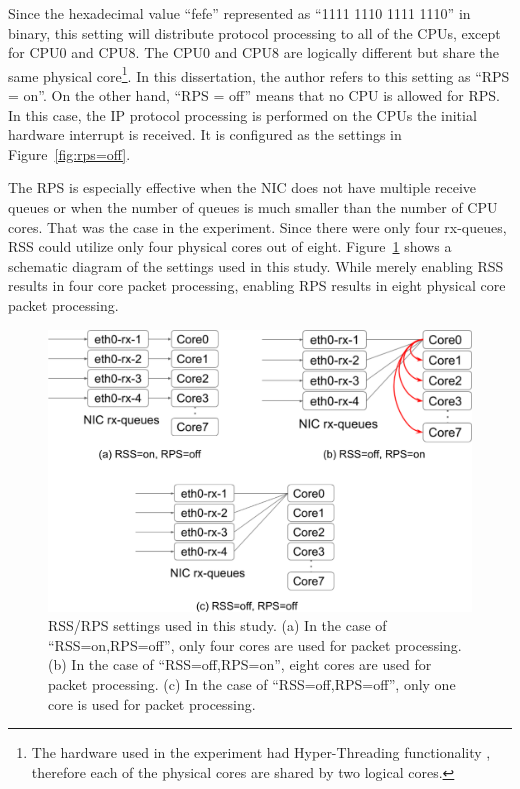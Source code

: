 Since the hexadecimal value \enquote{fefe} represented as \enquote{1111 1110 1111 1110} in binary, 
this setting will distribute protocol processing to all of the CPUs, except for CPU0 and CPU8.
The CPU0 and CPU8 are logically different but share the same physical core\footnote{The hardware used in the experiment had Hyper-Threading functionality \cite{marr2002hyper}, therefore each of the physical cores are shared by two logical cores.}.
In this dissertation, the author refers to this setting as \enquote{RPS = on}.
%
On the other hand, \enquote{RPS = off} means that no CPU is allowed for RPS. 
In this case, the IP protocol processing is performed on the CPUs the initial hardware interrupt is received.
It is configured as the settings in Figure~\ref{fig:rps=off}.

The RPS is especially effective when the NIC does not have multiple receive queues or when the number of queues is 
much smaller than the number of CPU cores. 
That was the case in the experiment.
Since there were only four rx-queues, RSS could utilize only four physical cores out of eight.
Figure~\ref{Figs/rss-rps-none} shows a schematic diagram of the settings used in this study.
While merely enabling RSS results in four core packet processing, enabling RPS results in eight physical core packet processing.

\begin{figure}[h]
  \centering
  \includegraphics[width=0.95\columnwidth]{Figs/rss-rps-none}

  \par\bigskip
  \centering
  \begin{minipage}{0.9\columnwidth}
    \caption[RSS/RPS settings]{
      RSS/RPS settings used in this study.
      (a) In the case of \enquote{RSS=on,RPS=off}, only four cores are used for packet processing.
      (b) In the case of \enquote{RSS=off,RPS=on}, eight cores are used for packet processing.
      (c) In the case of \enquote{RSS=off,RPS=off}, only one core is used for packet processing.
    }
    \label{Figs/rss-rps-none}
  \end{minipage}
\end{figure}

